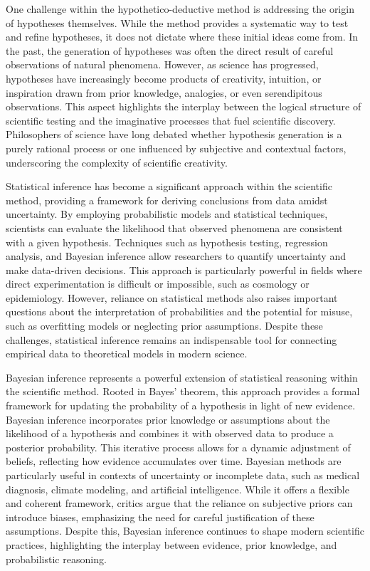 One challenge within the hypothetico-deductive method is addressing the origin of hypotheses themselves. While the method provides a systematic way to test and refine hypotheses, it does not dictate where these initial ideas come from. In the past, the generation of hypotheses was often the direct result of careful observations of natural phenomena. However, as science has progressed, hypotheses have increasingly become products of creativity, intuition, or inspiration drawn from prior knowledge, analogies, or even serendipitous observations. This aspect highlights the interplay between the logical structure of scientific testing and the imaginative processes that fuel scientific discovery. Philosophers of science have long debated whether hypothesis generation is a purely rational process or one influenced by subjective and contextual factors, underscoring the complexity of scientific creativity.

Statistical inference has become a significant approach within the scientific method, providing a framework for deriving conclusions from data amidst uncertainty. By employing probabilistic models and statistical techniques, scientists can evaluate the likelihood that observed phenomena are consistent with a given hypothesis. Techniques such as hypothesis testing, regression analysis, and Bayesian inference allow researchers to quantify uncertainty and make data-driven decisions. This approach is particularly powerful in fields where direct experimentation is difficult or impossible, such as cosmology or epidemiology. However, reliance on statistical methods also raises important questions about the interpretation of probabilities and the potential for misuse, such as overfitting models or neglecting prior assumptions. Despite these challenges, statistical inference remains an indispensable tool for connecting empirical data to theoretical models in modern science.

Bayesian inference represents a powerful extension of statistical reasoning within the scientific method. Rooted in Bayes' theorem, this approach provides a formal framework for updating the probability of a hypothesis in light of new evidence. Bayesian inference incorporates prior knowledge or assumptions about the likelihood of a hypothesis and combines it with observed data to produce a posterior probability. This iterative process allows for a dynamic adjustment of beliefs, reflecting how evidence accumulates over time. Bayesian methods are particularly useful in contexts of uncertainty or incomplete data, such as medical diagnosis, climate modeling, and artificial intelligence. While it offers a flexible and coherent framework, critics argue that the reliance on subjective priors can introduce biases, emphasizing the need for careful justification of these assumptions. Despite this, Bayesian inference continues to shape modern scientific practices, highlighting the interplay between evidence, prior knowledge, and probabilistic reasoning.


